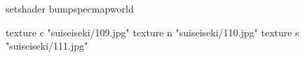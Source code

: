 setshader bumpspecmapworld

    texture c "suiseiseki/109.jpg"
    texture n "suiseiseki/110.jpg"
    texture s "suiseiseki/111.jpg"

